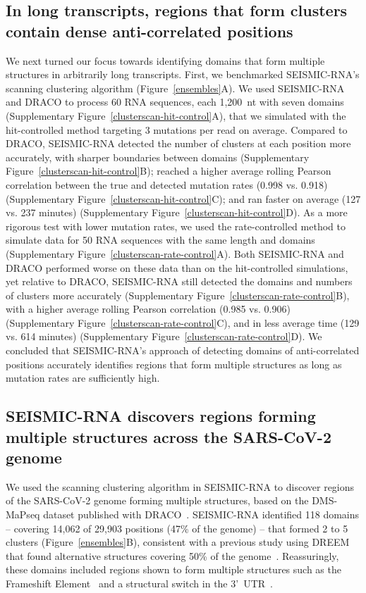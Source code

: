 \documentclass[unnumsec,webpdf,contemporary,large]{oup-authoring-template}%
\theoremstyle{thmstyleone}%
\theoremstyle{thmstyletwo}%
\theoremstyle{thmstylethree}%
\begin{document}
\subsection{In long transcripts, regions that form clusters contain dense anti-correlated positions}
\label{dense-correlations}

We next turned our focus towards identifying domains that form multiple structures in arbitrarily long transcripts.
First, we benchmarked SEISMIC-RNA's scanning clustering algorithm (Figure~\ref{ensembles}A).
We used SEISMIC-RNA and DRACO to process 60 RNA sequences, each 1,200~nt with seven domains (Supplementary Figure~\ref{clusterscan-hit-control}A), that we simulated with the hit-controlled method targeting 3 mutations per read on average.
Compared to DRACO, SEISMIC-RNA detected the number of clusters at each position more accurately, with sharper boundaries between domains (Supplementary Figure~\ref{clusterscan-hit-control}B); reached a higher average rolling Pearson correlation between the true and detected mutation rates (0.998 vs. 0.918) (Supplementary Figure~\ref{clusterscan-hit-control}C); and ran faster on average (127 vs. 237 minutes) (Supplementary Figure~\ref{clusterscan-hit-control}D).
As a more rigorous test with lower mutation rates, we used the rate-controlled method to simulate data for 50 RNA sequences with the same length and domains (Supplementary Figure~\ref{clusterscan-rate-control}A).
Both SEISMIC-RNA and DRACO performed worse on these data than on the hit-controlled simulations, yet relative to DRACO, SEISMIC-RNA still detected the domains and numbers of clusters more accurately (Supplementary Figure~\ref{clusterscan-rate-control}B), with a higher average rolling Pearson correlation (0.985 vs. 0.906) (Supplementary Figure~\ref{clusterscan-rate-control}C), and in less average time (129 vs. 614 minutes) (Supplementary Figure~\ref{clusterscan-rate-control}D).
We concluded that SEISMIC-RNA's approach of detecting domains of anti-correlated positions accurately identifies regions that form multiple structures as long as mutation rates are sufficiently high.


\subsection{SEISMIC-RNA discovers regions forming multiple structures across the SARS-CoV-2 genome}

We used the scanning clustering algorithm in SEISMIC-RNA to discover regions of the SARS-CoV-2 genome forming multiple structures, based on the DMS-MaPseq dataset published with DRACO~\cite{Morandi2021}.
SEISMIC-RNA identified 118 domains -- covering 14,062 of 29,903 positions (47\% of the genome) -- that formed 2 to 5 clusters (Figure~\ref{ensembles}B), consistent with a previous study using DREEM that found alternative structures covering 50\% of the genome~\cite{Lan2022}.
Reassuringly, these domains included regions shown to form multiple structures such as the Frameshift Element~\cite{Lan2022, Ziv2020} and a structural switch in the 3'~UTR~\cite{Yang2015a}.
\end{document}
